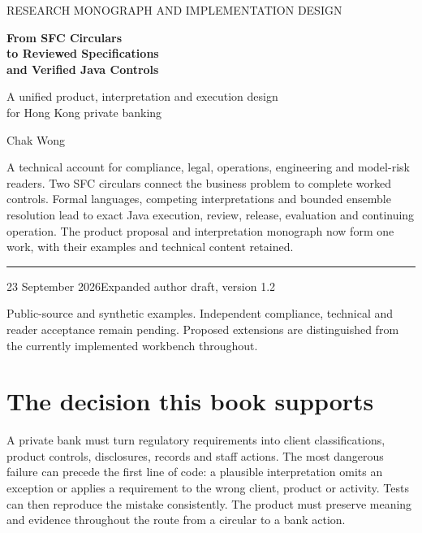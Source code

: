 \documentclass[12pt,a4paper,oneside,openany]{book}
\begin{document}
\raggedbottom
\frontmatter
\hypersetup{pageanchor=false}
\begin{titlepage}
\vspace*{15mm}
{\sffamily\color{teal}\large RESEARCH MONOGRAPH AND IMPLEMENTATION DESIGN\par}
\vspace{12mm}
{\sffamily\bfseries\color{navy}\fontsize{32}{37}\selectfont From SFC Circulars\\to Reviewed Specifications\\and Verified Java Controls\par}
\vspace{12mm}
{\Large A unified product, interpretation and execution design\\for Hong Kong private banking\par}
\vspace{12mm}
{\large Chak Wong\par}
\vfill
\begin{minipage}{0.94\textwidth}
A technical account for compliance, legal, operations, engineering and model-risk
readers. Two SFC circulars connect the business problem to complete worked
controls. Formal languages, competing interpretations and bounded ensemble
resolution lead to exact Java execution, review, release, evaluation and
continuing operation. The product proposal and interpretation monograph now
form one work, with their examples and technical content retained.
\end{minipage}
\vspace{16mm}
\hrule
\vspace{5mm}
23 September 2026\hfill Expanded author draft, version 1.2\par
\small Public-source and synthetic examples. Independent compliance, technical
and reader acceptance remain pending. Proposed extensions are distinguished
from the currently implemented workbench throughout.
\end{titlepage}
\hypersetup{pageanchor=true}
\chapter*{The decision this book supports}
A private bank must turn regulatory requirements into client classifications,
product controls, disclosures, records and staff actions. The most dangerous
failure can precede the first line of code: a plausible interpretation omits an
exception or applies a requirement to the wrong client, product or activity.
Tests can then reproduce the mistake consistently. The product must preserve
meaning and evidence throughout the route from a circular to a bank action.
\end{document}
